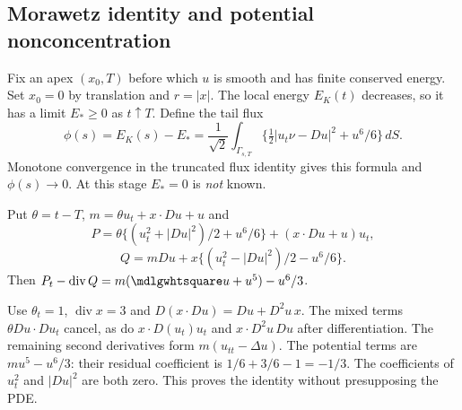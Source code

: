 \subsection{Morawetz identity and potential nonconcentration}
Fix an apex $(x_0,T)$ before which $u$ is smooth and has finite
conserved energy. Set $x_0=0$ by translation and $r=|x|$.
The local energy $E_K(t)$ decreases, so it has a limit $E_*\ge0$
as $t\uparrow T$. Define the tail flux
\begin{equation}\label{eq:12-tail-flux}
 \phi(s)=E_K(s)-E_*
 =\frac1{\sqrt2}\int_{\Gamma_{s,T}}
       \{\tfrac12|u_t\nu-Du|^2+u^6/6\}\,dS.
\end{equation}
Monotone convergence in the truncated flux identity gives this
formula and $\phi(s)\to0$. At this stage $E_*=0$ is \emph{not} known.

\begin{lemma}
Put $\theta=t-T$, $m=\theta u_t+x\cdot Du+u$ and
\[
 P=\theta\{(u_t^2+|Du|^2)/2+u^6/6\}+(x\cdot Du+u)u_t,
\]
\[
 Q=mDu+x\{(u_t^2-|Du|^2)/2-u^6/6\}.
\]
Then $P_t-\operatorname{div}Q=m(\PDEWave u+u^5)-u^6/3$.
\end{lemma}
\begin{expandedproof}
Use $\theta_t=1$, $\operatorname{div}x=3$ and
$D(x\cdot Du)=Du+D^2u\,x$.
The mixed terms $\theta Du\cdot Du_t$ cancel, as do
$x\cdot D(u_t)u_t$ and $x\cdot D^2u\,Du$ after differentiation.
The remaining second derivatives form $m(u_{tt}-\Delta u)$.
The potential terms are $m u^5-u^6/3$: their residual coefficient
is $1/6+3/6-1=-1/3$. The coefficients of $u_t^2$ and $|Du|^2$
are both zero. This proves the identity without presupposing the PDE.
\end{expandedproof}

